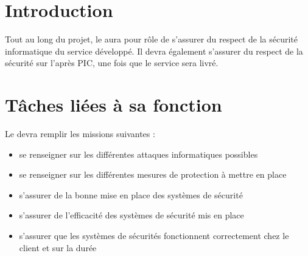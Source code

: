\documentclass[11pt]{article}
\begin{document}

\section*{Introduction}

Tout au long du projet, le \RS{} aura pour rôle de s'assurer du respect de la sécurité informatique du service développé. Il devra également s'assurer du respect de la sécurité sur l'après PIC, une fois que le service sera livré.

\section*{Tâches liées à sa fonction}

Le \RS{} devra remplir les missions suivantes :
\begin{itemize}
	\item se renseigner sur les différentes attaques informatiques possibles
	\item se renseigner sur les différentes mesures de protection à mettre en place
	\item s'assurer de la bonne mise en place des systèmes de sécurité
	\item s'assurer de l'efficacité des systèmes de sécurité mis en place
	\item s'assurer que les systèmes de sécurités fonctionnent correctement chez le client et sur la durée
\end{itemize}
\end{document}
